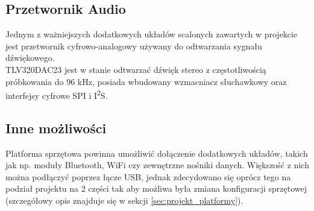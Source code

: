 \documentclass[a4paper,12pt]{book}
\begin{document}
			\subsection{Przetwornik Audio}
				Jednym z ważniejszych dodatkowych układów scalonych zawartych w projekcie jest przetwornik cyfrowo-analogowy używany do odtwarzania sygnału dźwiękowego.\\
				TLV320DAC23 jest w stanie odtwarzać dźwięk stereo z częstotliwością próbkowania do 96 kHz, posiada wbudowany wzmacniacz słuchawkowy oraz interfejsy cyfrowe SPI i I\textsuperscript{2}S.
			\subsection{Inne możliwości}
				Platforma sprzętowa powinna umożliwić dołączenie dodatkowych układów, takich jak np. moduły Bluetooth, WiFi czy zewnętrzne nośniki danych. Większość z nich można podłączyć poprzez łącze USB, jednak zdecydowano się oprócz tego na podział projektu na 2 części tak aby możliwa była zmiana konfiguracji sprzętowej (szczegółowy opis znajduje się w sekcji \ref{sec:projekt_platformy}).
\end{document}
